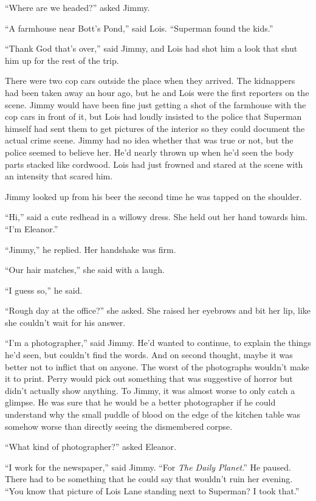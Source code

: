 \documentclass[ebook,12pt]{memoir}
\begin{document}
``Where are we headed?'' asked Jimmy.

``A farmhouse near Bott's Pond,'' said Lois. ``Superman found the
kids.''

``Thank God that's over,'' said Jimmy, and Lois had shot him a look that
shut him up for the rest of the trip.

There were two cop cars outside the place when they arrived. The
kidnappers had been taken away an hour ago, but he and Lois were the
first reporters on the scene. Jimmy would have been fine just getting a
shot of the farmhouse with the cop cars in front of it, but Lois had
loudly insisted to the police that Superman himself had sent them to get
pictures of the interior so they could document the actual crime scene.
Jimmy had no idea whether that was true or not, but the police seemed to
believe her. He'd nearly thrown up when he'd seen the body parts stacked
like cordwood. Lois had just frowned and stared at the scene with an
intensity that scared him.

Jimmy looked up from his beer the second time he was tapped on the
shoulder.

``Hi,'' said a cute redhead in a willowy dress. She held out her hand
towards him. ``I'm Eleanor.''

``Jimmy,'' he replied. Her handshake was firm.

``Our hair matches,'' she said with a laugh.

``I guess so,'' he said.

``Rough day at the office?'' she asked. She raised her eyebrows and bit
her lip, like she couldn't wait for his answer.

``I'm a photographer,'' said Jimmy. He'd wanted to continue, to explain
the things he'd seen, but couldn't find the words. And on second
thought, maybe it was better not to inflict that on anyone. The worst of
the photographs wouldn't make it to print. Perry would pick out
something that was suggestive of horror but didn't actually show
anything. To Jimmy, it was almost worse to only catch a glimpse. He was
sure that he would be a better photographer if he could understand why
the small puddle of blood on the edge of the kitchen table was somehow
worse than directly seeing the dismembered corpse.

``What kind of photographer?'' asked Eleanor.

``I work for the newspaper,'' said Jimmy. ``For \emph{The Daily
Planet}.'' He paused. There had to be something that he could say that
wouldn't ruin her evening. ``You know that picture of Lois Lane standing
next to Superman? I took that.''
\end{document}
